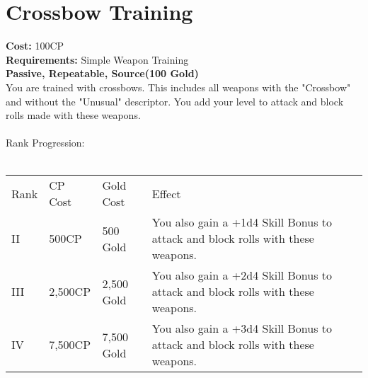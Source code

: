 \section{Crossbow Training}\label{perk:crossbowTraining}
\textbf{Cost:} 100CP\\
\textbf{Requirements:} Simple Weapon Training\\
\textbf{Passive, Repeatable, Source(100 Gold)}\\
You are trained with crossbows.
This includes all weapons with the "Crossbow" and without the "Unusual" descriptor.
You add your level to attack and block rolls made with these weapons.\\
\\
Rank Progression:\\
\\
\begin{longtable}{l | l | l | p{9cm}}
	Rank & CP Cost & Gold Cost & Effect\\
	II & 500CP & 500 Gold & You also gain a +1d4 Skill Bonus to attack and block rolls with these weapons.\\
	III & 2,500CP & 2,500 Gold & You also gain a +2d4 Skill Bonus to attack and block rolls with these weapons.\\
	IV & 7,500CP & 7,500 Gold & You also gain a +3d4 Skill Bonus to attack and block rolls with these weapons.\\
\end{longtable}